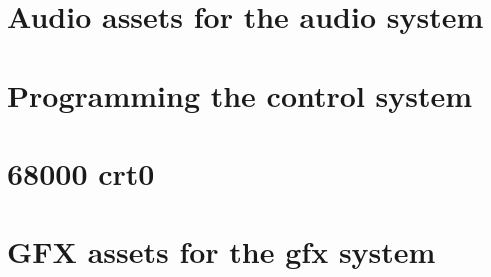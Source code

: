 \section{Audio assets for the audio system}

\section{Programming the control system}


\section{68000 crt0}
\pagebreak
{}

\section{GFX assets for the gfx system}

\pagebreak
{}
